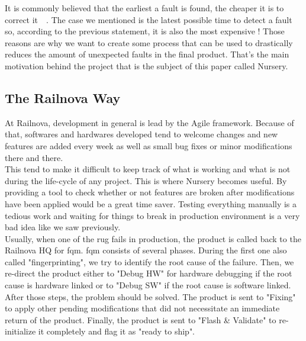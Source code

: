 \documentclass[12pt]{article}
\theoremstyle{definition}
\theoremstyle{definition}
\begin{document}
It is commonly believed that the earliest a fault is found, the cheaper it is to correct it~\cite{EconomicsSTBC:2017}~\cite{EconomicsWiki:2017}. The case we mentioned is the latest possible time to detect a fault so, according to the previous statement, it is also the most expensive ! Those reasons are why we want to create some process that can be used to drastically reduces the amount of unexpected faults in the final product. That's the main motivation behind the project that is the subject of this paper called Nursery.\\

\subsection{The Railnova Way}

At Railnova, development in general is lead by the Agile framework. Because of that, softwares and hardwares developed tend to welcome changes and new features are added every week as well as small bug fixes or minor modifications there and there.\\

This tend to make it difficult to keep track of what is working and what is not during the life-cycle of any project. This is where Nursery becomes useful. By providing a tool to check whether or not features are broken after modifications have been applied would be a great time saver. Testing everything manually is a tedious work and waiting for things to break in production environment is a very bad idea like we saw previously.\\

Usually, when one of the \gls{rug} fails in production, the product is called back to the Railnova HQ for \gls{fqm}. \gls{fqm} consists of several phases. During the first one also called "fingerprinting", we try to identify the root cause of the failure. Then, we re-direct the product either to "Debug HW" for hardware debugging if the root cause is hardware linked or to "Debug SW" if the root cause is software linked. After those steps, the problem should be solved. The product is sent to "Fixing" to apply other pending modifications that did not necessitate an immediate return of the product. Finally, the product is sent to "Flash \& Validate" to re-initialize it completely and flag it as "ready to ship".\\


\end{document}
